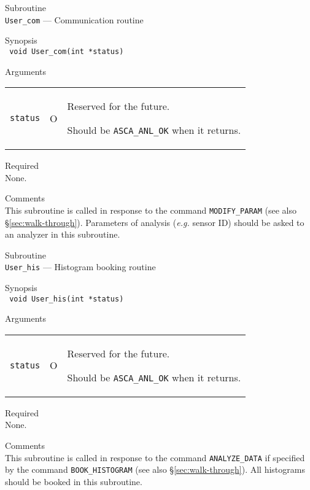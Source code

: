 \vspace{1cm}

\newpage
\begin{description}
\item{Subroutine}\\
   {\tt User\_com} --- Communication routine
\item{Synopsis}\\
   {\tt
      void User\_com(int *status)
   }
\item{Arguments} \\
 \begin{tabular}{l@{\ (}c@{)\ }p{}}
   {\tt status} & O & Reserved for the future.\par
                      Should be {\tt ASCA\_ANL\_OK} when it returns.
 \end{tabular}
\item{Required} \\
   None.
\item{Comments} \\
   This subroutine is called in response to the command
   {\tt MODIFY\_PARAM} (see also \S \ref{sec:walk-through}).
   Parameters of analysis ({\em e.g.} sensor ID)
   should be asked to an analyzer in this subroutine.
\end{description}

\vspace{1cm}

\newpage
\begin{description}
\item{Subroutine}\\
   {\tt User\_his} --- Histogram booking routine
\item{Synopsis}\\
   {\tt
      void User\_his(int *status)
   }
\item{Arguments} \\
 \begin{tabular}{l@{\ (}c@{)\ }p{}}
   {\tt status} & O & Reserved for the future.\par
                      Should be {\tt ASCA\_ANL\_OK} when it returns.
 \end{tabular}
\item{Required} \\
   None.
\item{Comments} \\
   This subroutine is called in response to the command
  {\tt ANALYZE\_DATA} if specified by the command {\tt BOOK\_HISTOGRAM}
  (see also \S \ref{sec:walk-through}).
   All histograms should be booked in this subroutine.
\end{description}

